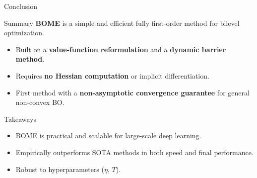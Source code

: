 \documentclass{beamer}
\begin{document}
\begin{frame}{Conclusion}
    \begin{block}{Summary}
        \textbf{BOME} is a simple and efficient fully first-order method for bilevel optimization.
        \begin{itemize}
            \item Built on a \textbf{value-function reformulation} and a \textbf{dynamic barrier method}.
            \item Requires \textbf{no Hessian computation} or implicit differentiation.
            \item First method with a \textbf{non-asymptotic convergence guarantee} for general non-convex BO.
        \end{itemize}
    \end{block}
    \begin{block}{Takeaways}
        \begin{itemize}
            \item BOME is practical and scalable for large-scale deep learning.
            \item Empirically outperforms SOTA methods in both speed and final performance.
            \item Robust to hyperparameters ($\eta$, $T$).
        \end{itemize}
    \end{block}
\end{frame}
\end{document}
